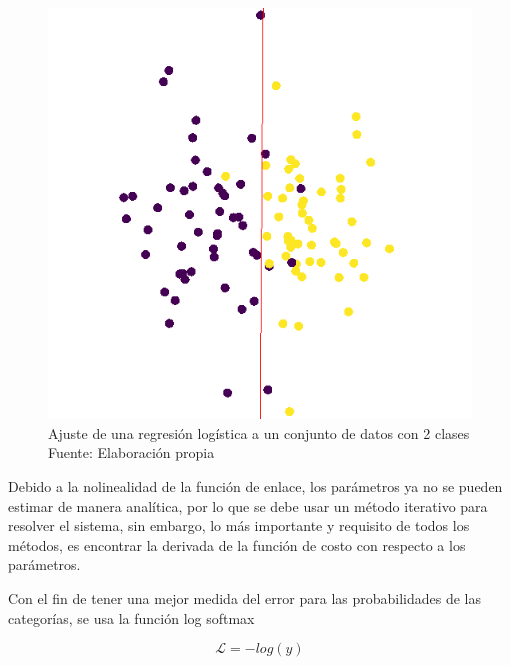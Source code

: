         \begin{figure}[H]
            \centering
            \includegraphics[scale=0.35]{imagenes/logistic_reg}
            \caption[Ajuste de regresión logística]{Ajuste de una regresión logística a un conjunto de datos con 2 clases\\ Fuente: Elaboración propia}
        \end{figure}
        Debido a la nolinealidad de la función de enlace, los parámetros ya no se pueden estimar de manera analítica, por lo que se debe usar un método iterativo para resolver el sistema, sin embargo, lo más importante y requisito de todos los métodos, es encontrar la derivada de la función de costo con respecto a los parámetros.
        
        Con el fin de tener una mejor medida del error para las probabilidades de las categorías, se usa la función log softmax
        
        \begin{equation}
            \mathcal{L} = -log(\hat{y})
        \end{equation}
        
